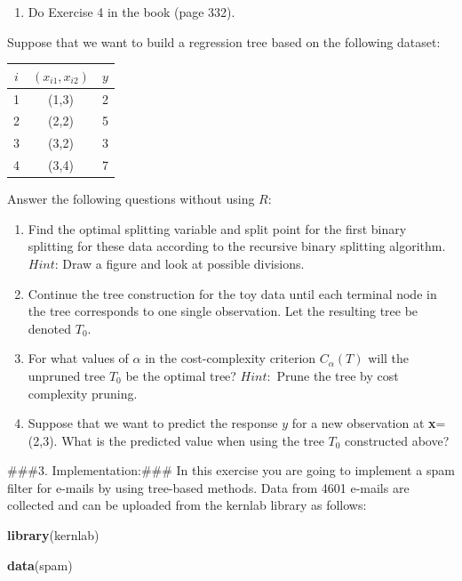 \documentclass[]{article}
\newenvironment{Shaded}{\begin{snugshade}}{\end{snugshade}}
\newcommand{\KeywordTok}[1]{\textcolor[rgb]{0.13,0.29,0.53}{\textbf{#1}}}
\newcommand{\NormalTok}[1]{#1}
\providecommand{\tightlist}{%
  \setlength{\itemsep}{0pt}\setlength{\parskip}{0pt}}
\begin{document}
\begin{enumerate}
\def\labelenumi{\alph{enumi})}
\setcounter{enumi}{1}
\tightlist
\item
  Do Exercise 4 in the book (page 332).
\end{enumerate}

Suppose that we want to build a regression tree based on the following
dataset:

\begin{longtable}[]{@{}ccc@{}}
\toprule
\(i\) & \((x_{i1},x_{i2})\) & \(y\)\tabularnewline
\midrule
\endhead
1 & (1,3) & 2\tabularnewline
2 & (2,2) & 5\tabularnewline
3 & (3,2) & 3\tabularnewline
4 & (3,4) & 7\tabularnewline
\bottomrule
\end{longtable}

Answer the following questions without using \(R\):

\begin{enumerate}
\def\labelenumi{\alph{enumi})}
\setcounter{enumi}{2}
\item
  Find the optimal splitting variable and split point for the first
  binary splitting for these data according to the recursive binary
  splitting algorithm. \(Hint\): Draw a figure and look at possible
  divisions.
\item
  Continue the tree construction for the toy data until each terminal
  node in the tree corresponds to one single observation. Let the
  resulting tree be denoted \(T_0\).
\item
  For what values of \(\alpha\) in the cost-complexity criterion
  \(C_{\alpha}(T)\) will the unpruned tree \(T_0\) be the optimal tree?
  \(Hint:\) Prune the tree by cost complexity pruning.
\item
  Suppose that we want to predict the response \(y\) for a new
  observation at \textbf{x}=(2,3). What is the predicted value when
  using the tree \(T_0\) constructed above?
\end{enumerate}

\#\#\#3. Implementation:\#\#\# In this exercise you are going to
implement a spam filter for e-mails by using tree-based methods. Data
from 4601 e-mails are collected and can be uploaded from the kernlab
library as follows:

\begin{Shaded}
\begin{Highlighting}[]
\KeywordTok{library}\NormalTok{(kernlab)}

\KeywordTok{data}\NormalTok{(spam)}
\end{Highlighting}
\end{Shaded}
\end{document}
